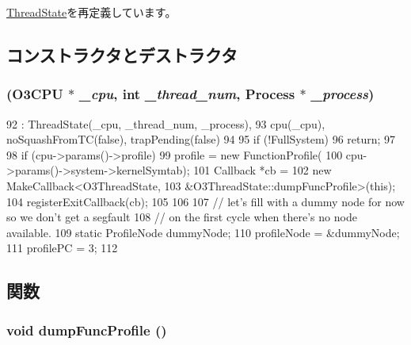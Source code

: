 \hyperlink{structThreadState_a3af29dcea6d2bbb0a1de56f02ec789f1}{ThreadState}を再定義しています。

\subsection{コンストラクタとデストラクタ}
\hypertarget{structO3ThreadState_ac155052720ec3adfe617a0bc7d5be7a0}{
\subsubsection[{O3ThreadState}]{ ({\bf O3CPU} $\ast$ {\em \_\-cpu}, \/  int {\em \_\-thread\_\-num}, \/  {\bf Process} $\ast$ {\em \_\-process})}}
\label{structO3ThreadState_ac155052720ec3adfe617a0bc7d5be7a0}



\begin{DoxyCode}
92         : ThreadState(_cpu, _thread_num, _process),
93           cpu(_cpu), noSquashFromTC(false), trapPending(false)
94     {
95         if (!FullSystem)
96             return;
97 
98         if (cpu->params()->profile) {
99             profile = new FunctionProfile(
100                     cpu->params()->system->kernelSymtab);
101             Callback *cb =
102                 new MakeCallback<O3ThreadState,
103                 &O3ThreadState::dumpFuncProfile>(this);
104             registerExitCallback(cb);
105         }
106 
107         // let's fill with a dummy node for now so we don't get a segfault
108         // on the first cycle when there's no node available.
109         static ProfileNode dummyNode;
110         profileNode = &dummyNode;
111         profilePC = 3;
112     }
\end{DoxyCode}


\subsection{関数}
\hypertarget{structO3ThreadState_a13fa12d1779a94a1e0b968946a1367c7}{
\subsubsection[{dumpFuncProfile}]{\setlength{\rightskip}{0pt plus 5cm}void dumpFuncProfile ()}}
\label{structO3ThreadState_a13fa12d1779a94a1e0b968946a1367c7}


